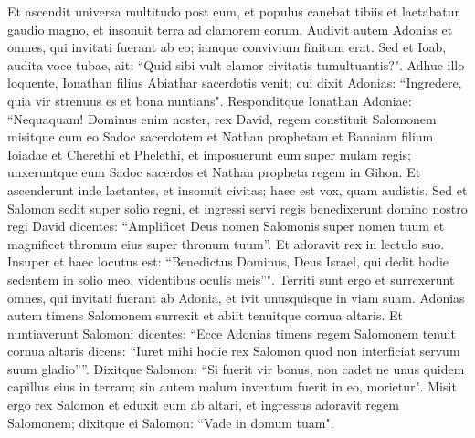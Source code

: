 \begin{biblechapter}
\verse Et ascendit universa multitudo post eum, et populus canebat tibiis et laetabatur gaudio magno, et insonuit terra ad clamorem eorum. 
\verse Audivit autem Adonias et omnes, qui invitati fuerant ab eo; iamque convivium finitum erat. Sed et Ioab, audita voce tubae, ait: “Quid sibi vult clamor civitatis tumultuantis?". 
\verse Adhuc illo loquente, Ionathan filius Abiathar sacerdotis venit; cui dixit Adonias: “Ingredere, quia vir strenuus es et bona nuntians". 
\verse Responditque Ionathan Adoniae: “Nequaquam! Dominus enim noster, rex David, regem constituit Salomonem 
\verse misitque cum eo Sadoc sacerdotem et Nathan prophetam et Banaiam filium Ioiadae et Cherethi et Phelethi, et imposuerunt eum super mulam regis; 
\verse unxeruntque eum Sadoc sacerdos et Nathan propheta regem in Gihon. Et ascenderunt inde laetantes, et insonuit civitas; haec est vox, quam audistis. 
\verse Sed et Salomon sedit super solio regni, 
\verse et ingressi servi regis benedixerunt domino nostro regi David dicentes: “Amplificet Deus nomen Salomonis super nomen tuum et magnificet thronum eius super thronum tuum”. Et adoravit rex in lectulo suo. 
\verse Insuper et haec locutus est: “Benedictus Dominus, Deus Israel, qui dedit hodie sedentem in solio meo, videntibus oculis meis”". 
\verse Territi sunt ergo et surrexerunt omnes, qui invitati fuerant ab Adonia, et ivit unusquisque in viam suam. 
\verse Adonias autem timens Salomonem surrexit et abiit tenuitque cornua altaris. 
\verse Et nuntiaverunt Salomoni dicentes: “Ecce Adonias timens regem Salomonem tenuit cornua altaris dicens: “Iuret mihi hodie rex Salomon quod non interficiat servum suum gladio””. 
\verse Dixitque Salomon: “Si fuerit vir bonus, non cadet ne unus quidem capillus eius in terram; sin autem malum inventum fuerit in eo, morietur". 
\verse Misit ergo rex Salomon et eduxit eum ab altari, et ingressus adoravit regem Salomonem; dixitque ei Salomon: “Vade in domum tuam". 
\end{biblechapter}

